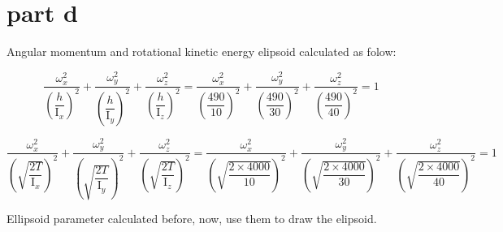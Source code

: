 \part{part d}

Angular momentum and rotational kinetic energy elipsoid calculated as folow:

\begin{equation}
    \dfrac{\omega_x^2}{\left(\dfrac{h}{\mathrm{I}_x}\right)^2} +
    \dfrac{\omega_y^2}{\left(\dfrac{h}{\mathrm{I}_y}\right)^2} +
    \dfrac{\omega_z^2}{\left(\dfrac{h}{\mathrm{I}_z}\right)^2} =
    \dfrac{\omega_x^2}{\left(\dfrac{490}{10}\right)^2} +
    \dfrac{\omega_y^2}{\left(\dfrac{490}{30}\right)^2} +
    \dfrac{\omega_z^2}{\left(\dfrac{490}{40}\right)^2} =
     1
\end{equation}


\begin{equation}
    \dfrac{\omega_x^2}{\left(\sqrt{\dfrac{2T}{\mathrm{I}_x}}\right)^2} +
    \dfrac{\omega_y^2}{\left(\sqrt{\dfrac{2T}{\mathrm{I}_y}}\right)^2} +
    \dfrac{\omega_z^2}{\left(\sqrt{\dfrac{2T}{\mathrm{I}_z}}\right)^2} =
    \dfrac{\omega_x^2}{\left(\sqrt{\dfrac{2\times 4000}{10}}\right)^2} +
    \dfrac{\omega_y^2}{\left(\sqrt{\dfrac{2\times 4000}{30}}\right)^2} +
    \dfrac{\omega_z^2}{\left(\sqrt{\dfrac{2\times 4000}{40}}\right)^2} = 1
\end{equation}

Ellipsoid parameter calculated before, now, use them to draw the elipsoid.

